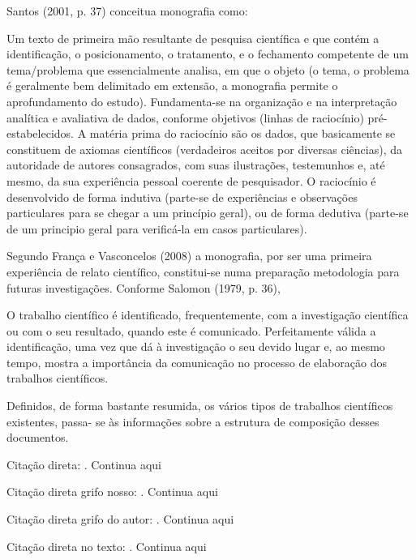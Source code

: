 \begin{Desenvolvimento}
Santos (2001, p. 37) conceitua monografia como:
\begin{citacaodiretalonga}
Um texto de primeira mão resultante de pesquisa científica e que contém a identificação, o posicionamento, o tratamento, e o fechamento competente de um tema/problema que essencialmente analisa, em que o objeto (o tema, o problema é geralmente bem delimitado em extensão, a monografia permite o aprofundamento do estudo). Fundamenta-se na organização e na interpretação analítica e avaliativa de dados, conforme objetivos (linhas de raciocínio) pré-estabelecidos. A matéria prima do raciocínio são os dados, que basicamente se constituem de axiomas científicos (verdadeiros aceitos por diversas ciências), da autoridade de autores consagrados, com suas ilustrações, testemunhos e, até mesmo, da sua experiência pessoal coerente de pesquisador. O raciocínio é desenvolvido de forma indutiva (parte-se de experiências e observações particulares para se chegar a um princípio geral), ou de forma dedutiva (parte-se de um principio geral para verificá-la em casos particulares).
\end{citacaodiretalonga}

Segundo França e Vasconcelos (2008) a monografia, por ser uma primeira experiência de relato científico, constitui-se numa preparação metodologia para futuras investigações. Conforme Salomon (1979, p. 36),

\begin{citacaodiretalonga}
O trabalho científico é identificado, frequentemente, com a investigação científica ou com o seu resultado, quando este é comunicado. Perfeitamente válida a identificação, uma vez que dá à investigação o seu devido lugar e, ao mesmo tempo, mostra a importância da comunicação no processo de elaboração dos trabalhos científicos.
\end{citacaodiretalonga}

Definidos, de forma bastante resumida, os vários tipos de trabalhos científicos existentes, passa- se às informações sobre a estrutura de composição desses documentos.

Citação direta: . Continua aqui

Citação direta grifo nosso: . Continua aqui

Citação direta grifo do autor: . Continua aqui

Citação direta no texto: . Continua aqui


\end{Desenvolvimento}
